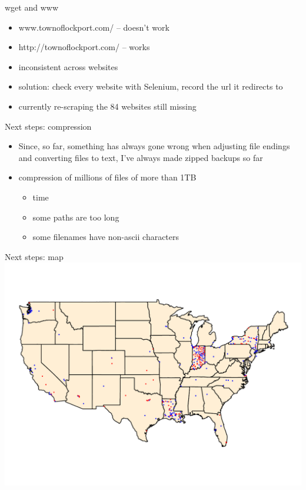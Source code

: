 \documentclass[12pt]{beamer}
\begin{document}
\begin{frame}{wget and www}
\begin{itemize}
	\item www.townoflockport.com/ -- doesn't work
	\item http://townoflockport.com/ -- works
	\item inconsistent across websites
	\item solution: check every website with Selenium, record the url it redirects to
	\item currently re-scraping the 84 websites still missing
\end{itemize}
\end{frame}

\begin{frame}{Next steps: compression}
\begin{itemize}
	\item Since, so far, something has always gone wrong when adjusting file endings and converting files to text, I've always made zipped backups so far
	\item compression of millions of files of more than 1TB
	\begin{itemize}
		\item time
		\item some paths are too long
		\item some filenames have non-ascii characters
	\end{itemize}
\end{itemize}
\end{frame}

\begin{frame}{Next steps: map}
\includegraphics[width=\linewidth, height = .99\textheight]{../figures/us_map.pdf}
\end{frame}
\end{document}
